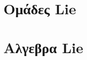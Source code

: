 \documentclass[12pt]{article}
\begin{document}
\section{Ομάδες \textlatin{Lie}}
\section{Αλγεβρα \textlatin{Lie} }
%

\newpage
{}


\end{document}
